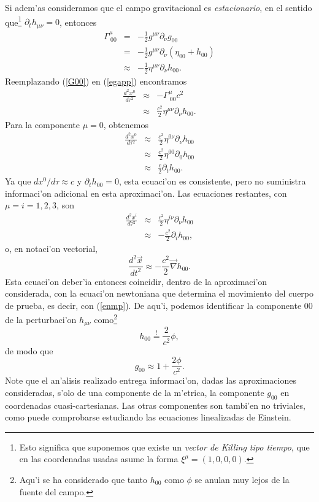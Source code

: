 Si adem'as consideramos que el campo gravitacional es \textit{estacionario}, en el
sentido que\footnote{Esto significa que suponemos que existe un \textit{vector de Killing tipo tiempo}, que en las coordenadas usadas asume la forma $\xi^\mu=(1,0,0,0)$.} $\partial_t h_{\mu\nu}=0$, entonces
\begin{eqnarray}
 \Gamma_{\ 00}^\mu &=&-\frac{1}2g^{\mu\nu}\partial_\nu g_{00} \\
&=&-\frac{1}{2}g^{\mu\nu}
\partial_\nu\left( \eta_{00}+h_{00}\right) \\
&\approx&-\frac{1}2\eta^{\mu\nu}\partial_\nu h_{00}. \label{G00}
\end{eqnarray}
Reemplazando (\ref{G00}) en (\ref{egapp}) encontramos
\begin{eqnarray}
\frac{d^2x^\mu }{d\tau^2}&\approx& -\Gamma_{\ 00}^\mu c^2\\
&\approx& \frac{c^2}2\eta^{\mu\nu}\partial_\nu h_{00} .
\end{eqnarray}
Para la componente $\mu=0$, obtenemos
\begin{eqnarray}
\frac{d^2x^0}{d\tau^2}&\approx& \frac{c^2}2\eta^{0\nu}\partial_\nu h_{00}\\
&\approx& \frac{c^2}{2}\eta^{00}\partial_0 h_{00}\\
&\approx& \frac{c}{2}\partial_t h_{00}.
\end{eqnarray}
Ya que $dx^0/d\tau\approx c$ y $\partial_t h_{00}=0$, esta ecuaci'on es consistente,
pero no suministra informaci'on adicional en esta aproximaci'on. Las ecuaciones
restantes, con $\mu=i=1,2,3$, son
\begin{eqnarray}
\frac{d^2x^i}{d\tau^2}&\approx&\frac{c^2}{2}\eta^{i\nu}\partial_\nu h_{00} \\
&\approx&-\frac{c^2}{2}\partial_i h_{00},
\end{eqnarray}
o, en notaci'on vectorial,
\begin{equation}
 \frac{d^2\vec{x}}{dt^2}\approx -\frac{c^2}{2}\vec{\nabla}h_{00}.
\end{equation}
Esta ecuaci'on deber'ia entonces coincidir, dentro de la aproximaci'on considerada,
con la ecuaci'on newtoniana que determina el movimiento del cuerpo de prueba, es decir, con (\ref{enmp}). De aqu'i, podemos
identificar la componente $00$ de la perturbaci'on $h_{\mu\nu}$ como\footnote{Aqu'i se ha considerado que tanto $h_{00}$ como $\phi$ se anulan muy lejos de la fuente del campo.}
\begin{equation}
h_{00}\stackrel{!}{=}\frac{2}{c^2}\phi, \label{h00phi}
\end{equation}
de modo que
\begin{equation}
\boxed{g_{00}\approx 1+\frac{2\phi}{c^2}.} \label{g00phi}
\end{equation}
Note que el an'alisis realizado entrega informaci'on, dadas las aproximaciones consideradas, s'olo de una componente de la m'etrica, la componente $g_{00}$ en coordenadas cuasi-cartesianas. Las otras componentes son tambi'en no triviales, como puede comprobarse estudiando las ecuaciones linealizadas de Einstein. 

